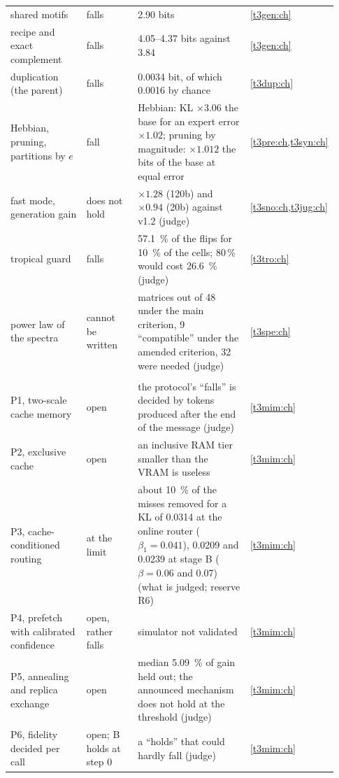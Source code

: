 \begin{longtable}{@{}>{\raggedright\arraybackslash}p{0.25\linewidth}>{\raggedright\arraybackslash}p{0.17\linewidth}>{\raggedright\arraybackslash}p{0.40\linewidth}>{\raggedright\arraybackslash}p{0.11\linewidth}@{}}
shared motifs & falls & \num{2.90} bits & \cref{t3gen:ch} \\
recipe and exact complement & falls & \numrange{4.05}{4.37} bits against \num{3.84} & \cref{t3gen:ch} \\
duplication (the parent) & falls & \num{0.0034} bit, of which \num{0.0016} by chance & \cref{t3dup:ch} \\
Hebbian, pruning, partitions by $e$ & fall & Hebbian: KL $\times 3.06$ the base for an expert error $\times 1.02$; pruning by magnitude: $\times 1.012$ the bits of the base at equal error & \cref{t3pre:ch,t3syn:ch} \\
fast mode, generation gain & does not hold & $\times 1.28$ (120b) and $\times 0.94$ (20b) against v1.2 (judge) & \cref{t3sno:ch,t3jug:ch} \\
tropical guard & falls & \SI{57.1}{\percent} of the flips for \SI{10}{\percent} of the cells; 80\,\% would cost \SI{26.6}{\percent} (judge) & \cref{t3tro:ch} \\
power law of the spectra & cannot be written & 0 matrices out of 48 under the main criterion, 9 ``compatible'' under the amended criterion, 32 were needed (judge) & \cref{t3spe:ch} \\
\multicolumn{4}{@{}l}{\textsf{\bfseries Open}} \\
P1, two-scale cache memory & open & the protocol's ``falls'' is decided by tokens produced after the end of the message (judge) & \cref{t3mim:ch} \\
P2, exclusive cache & open & an inclusive RAM tier smaller than the VRAM is useless & \cref{t3mim:ch} \\
P3, cache-conditioned routing & at the limit & about \SI{10}{\percent} of the misses removed for a KL of \num{0.0314} at the online router ($\beta_1 = \num{0.041}$), \num{0.0209} and \num{0.0239} at stage B ($\beta = \num{0.06}$ and \num{0.07}) (what is judged; reserve R6) & \cref{t3mim:ch} \\
P4, prefetch with calibrated confidence & open, rather falls & simulator not validated & \cref{t3mim:ch} \\
P5, annealing and replica exchange & open & median \SI{5.09}{\percent} of gain held out; the announced mechanism does not hold at the threshold (judge) & \cref{t3mim:ch} \\
P6, fidelity decided per call & open; B holds at step 0 & a ``holds'' that could hardly fall (judge) & \cref{t3mim:ch} \\
\bottomrule
\end{longtable}
\endgroup

